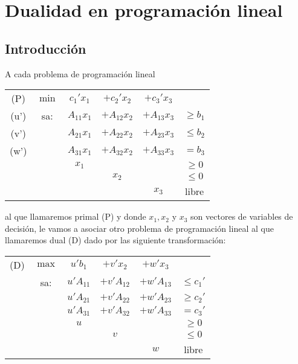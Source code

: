 \documentclass[PM.tex]{subfiles}
\begin{document}
\chapter{Dualidad en programación lineal}
\section{Introducción}
A cada problema de programación lineal

\begin{center}
\begin{tabular}{cccccc}
(P) & $\min$ & $c_1'x_1$ & $+c_2'x_2$   & $+c_3'x_3$\\
(u') & sa: & $A_{11}x_1$ & $+A_{12}x_2$ & $+ A_{13}x_3$ & $≥ b_1$\\
(v') &     & $A_{21}x_1$ & $+A_{22}x_2$ & $+ A_{23}x_3$ & $≤ b_2$\\
(w') &     & $A_{31}x_1$ & $+A_{32}x_2$ & $+ A_{33}x_3$ & $= b_3$\\
     &     &       $x_1$ &              &               & $≥ 0$\\
     &     &             &      $x_2$   &               & $≤ 0$\\
     &     &             &              &         $x_3$ & libre
\end{tabular}
\end{center}
al que llamaremos primal (P) y donde $x_1, x_2$ y $x_3$ son vectores de variables de decisión, le vamos a asociar otro problema de programación lineal al que llamaremos dual (D) dado por las siguiente transformación:

\begin{center}
\begin{tabular}{cccccc}
(D) & $\max$ & $u'b_1$ & $+v'x_2$ & $+w'x_3$\\
    & sa: & $u'A_{11}$ & $+v'A_{12}$ & $+w'A_{13}$ & $≤ c_1'$\\
    &     & $u'A_{21}$ & $+v'A_{22}$ & $+w'A_{23}$ & $≥ c_2'$\\
    &     & $u'A_{31}$ & $+v'A_{32}$ & $+w'A_{33}$ & $= c_3'$\\
    &     &       $u$  &             &             & $≥ 0$\\
    &     &            &      $v$    &             & $≤ 0$\\
    &     &            &             &      $w$    & libre
\end{tabular}
\end{center}
\end{document}
